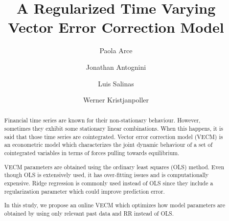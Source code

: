 \documentclass[12pt,reqno]{amsart}
\title{A Regularized Time Varying Vector Error Correction Model}
\author{Paola Arce \and Jonathan Antognini \and Luis Salinas \and Werner Kristjanpoller}
\begin{document}
\maketitle

\begin{abstract}
Financial time series are known for their non-stationary behaviour. However,
sometimes they exhibit some stationary linear combinations. When this happens,
it is said that those time series are cointegrated. Vector error correction
model (VECM) is an econometric model which characterizes the joint dynamic
behaviour of a set of cointegrated variables in terms of forces pulling towards
equilibrium. 

VECM parameters are obtained using the ordinary least squares (OLS)
method.  Even though OLS is extensively used, it has over-fitting
issues and is computationally expensive. Ridge regression is commonly used
instead of OLS since they include a regularization parameter which could improve
prediction error.

In this study, we propose an online VECM which optimizes how model parameters
are obtained by using only relevant past data and RR instead of OLS.  
\end{abstract}


%

%
%
%


%
%
%
%
%
%
%
\end{document}
